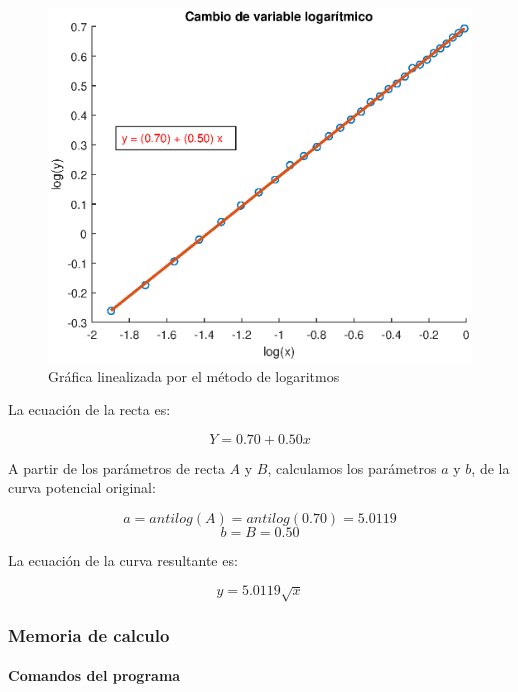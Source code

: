 \documentclass[letter,11pt]{article}
\begin{document}
\begin{figure}[!h]
\centering
\includegraphics[scale=1.00]{eps/3.4.2.eps}
\caption{Gráfica linealizada por el método de logaritmos}
\label{practica34_2}
\end{figure}

La ecuación de la recta es:

\begin{equation}
    Y = 0.70 + 0.50 x
\end{equation}

A partir de los parámetros de recta $A$ y $B$, calculamos los parámetros $a$ y
$b$, de la curva potencial original:

\begin{equation*}
    a = antilog(A) = antilog(0.70) = 5.0119
\end{equation*}
\begin{equation*}
    b = B = 0.50
\end{equation*}

La ecuación de la curva resultante es:

\begin{equation}
    y = 5.0119 \sqrt{x}
\end{equation}

\subsubsection{Memoria de calculo}

\paragraph{Comandos del programa}
\begin{alltt}
\footnotesize

\normalsize
\end{alltt}
\end{document}
